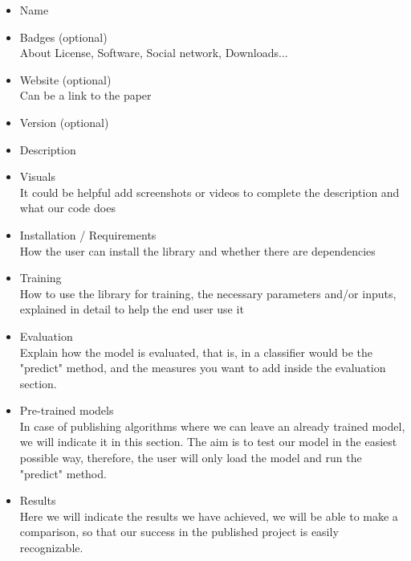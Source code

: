 \documentclass[a4paper]{article}
\begin{document}
			\begin{itemize}
				\item Name
				\item Badges (optional)\\
					About License, Software, Social network, Downloads...
				\item Website (optional)\\
					Can be a link to the paper
				\item Version (optional)\\
				\item Description
				\item Visuals\\
					It could be helpful add screenshots or videos to complete the description and what our code does
				\item Installation / Requirements\\
					How the user can install the library and whether there are dependencies
				\item Training\\
					How to use the library for training, the necessary parameters and/or inputs, explained in detail to help the end user use it\\
				\item Evaluation\\
					Explain how the model is evaluated, that is, in a classifier would be the "predict" method, and the measures you want to add inside the evaluation section.\\
				\item Pre-trained models\\
					In case of publishing algorithms where we can leave an already trained model, we will indicate it in this section.
					The aim is to test our model in the easiest possible way, therefore, the user will only load the model and run the "predict" method.\\
				\item Results\\
					Here we will indicate the results we have achieved, we will be able to make a comparison, so that our success in the published project is easily recognizable.\\
			\begin{comment}
				\item Examples (optional)\\
					 Only in case we think it is necessary, we can add this section, but mainly with the previous ones it is enough.
					 Also if we have the examples in the folder "tests" the user will go directly there to see the examples.

\end{comment}
\end{itemize}
\end{document}
